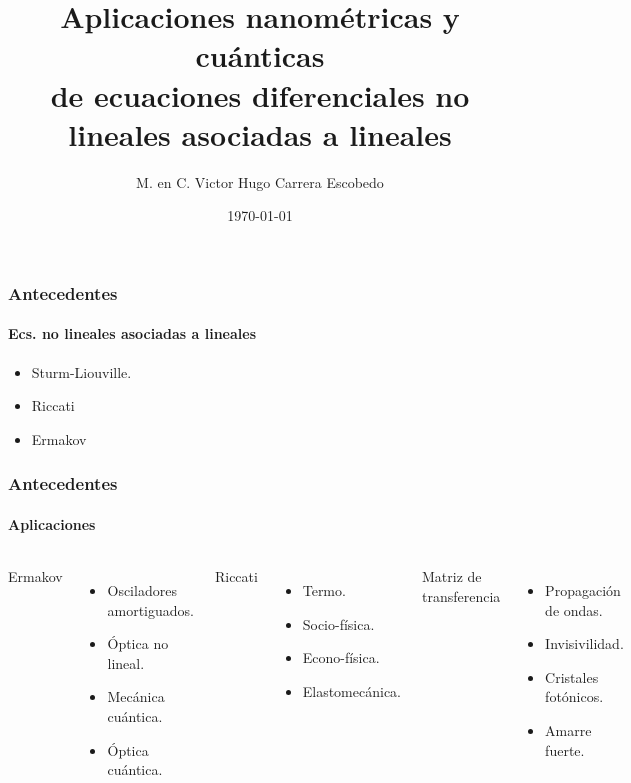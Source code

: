 \documentclass{beamer}
\title{Aplicaciones nanométricas y cuánticas \\de 
ecuaciones diferenciales no lineales asociadas a lineales}
\date{\today}
\author[Vic]{M. en C. Victor Hugo Carrera Escobedo} %
\begin{document}


\begin{frame}
\titlepage
\end{frame}


\begin{frame}
\frametitle{Antecedentes}
\framesubtitle{Ecs. no lineales asociadas a lineales}

\begin{itemize}
 \item Sturm-Liouville.
 \item Riccati
 \item Ermakov
\end{itemize}

\end{frame}



\begin{frame}
\frametitle{Antecedentes}
\framesubtitle{Aplicaciones}
\begin{columns}
Ermakov
\begin{itemize}
 \item Osciladores amortiguados.
 \item Óptica no lineal.
 \item Mecánica cuántica.
 \item Óptica cuántica.
\end{itemize}

Riccati
\begin{itemize}
 \item Termo.
 \item Socio-física.
 \item Econo-física.
 \item Elastomecánica.
\end{itemize}

Matriz de transferencia
\begin{itemize}
 \item Propagación de ondas.
 \item Invisivilidad.
 \item Cristales fotónicos.
 \item Amarre fuerte.
\end{itemize}

\end{columns}
\end{frame}
\end{document}
